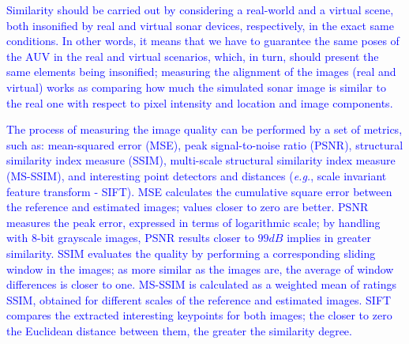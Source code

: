 \documentclass[final,5p,times]{elsarticle}
\begin{document}
\textcolor{blue}{Similarity should be carried out by considering a real-world and a virtual scene, both insonified by real and virtual sonar devices, respectively, in the exact same conditions. In other words, it means that we have to guarantee the same poses of the AUV in the real and virtual scenarios, which, in turn, should present the same elements being insonified; measuring the alignment of the images (real and virtual) works as comparing how much the simulated sonar image is similar to the real one with respect to pixel intensity and location and image components.}

\textcolor{blue}{The process of measuring the image quality can be performed by a set of metrics, such as: mean-squared error (MSE), peak signal-to-noise ratio (PSNR), structural similarity index measure (SSIM), multi-scale structural similarity index measure (MS-SSIM), and interesting point detectors and distances (\textit{e.g.}, scale invariant feature transform - SIFT). MSE calculates the cumulative square error between the reference and estimated images; values closer to zero are better. PSNR measures the peak error, expressed in terms of logarithmic scale; by handling with 8-bit grayscale images, PSNR results closer to $99 dB$ implies in greater similarity. SSIM evaluates the quality by performing a corresponding sliding window in the images; as more similar as the images are, the average of window differences is closer to one. MS-SSIM is calculated as a weighted mean of ratings SSIM, obtained for different scales of the reference and estimated images. SIFT compares the extracted interesting keypoints for both images; the closer to zero the Euclidean distance between them, the greater the similarity degree.}
\end{document}
